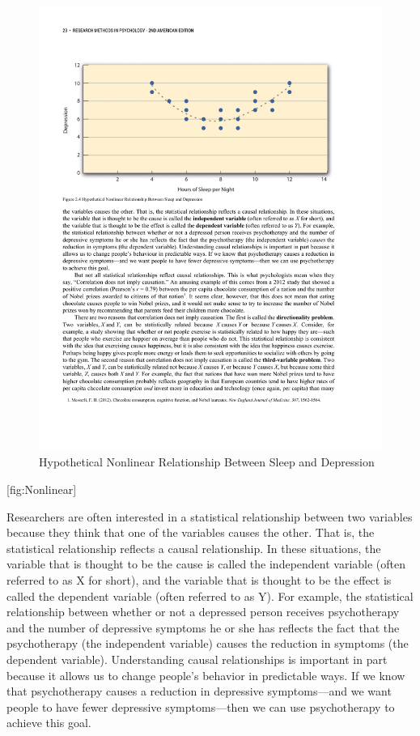 \documentclass[]{book}
\theoremstyle{definition}
\theoremstyle{definition}
\theoremstyle{remark}
\begin{document}
\begin{figure}[htbp]
\centering
\includegraphics{figures/C2F5Ucurve.pdf}
\caption{Hypothetical Nonlinear Relationship Between Sleep and
Depression}
\end{figure}

{[}fig:Nonlinear{]}

Researchers are often interested in a statistical relationship between
two variables because they think that one of the variables causes the
other. That is, the statistical relationship reflects a causal
relationship. In these situations, the variable that is thought to be
the cause is called the independent variable (often referred to as X for
short), and the variable that is thought to be the effect is called the
dependent variable (often referred to as Y). For example, the
statistical relationship between whether or not a depressed person
receives psychotherapy and the number of depressive symptoms he or she
has reflects the fact that the psychotherapy (the independent variable)
causes the reduction in symptoms (the dependent variable). Understanding
causal relationships is important in part because it allows us to change
people's behavior in predictable ways. If we know that psychotherapy
causes a reduction in depressive symptoms---and we want people to have
fewer depressive symptoms---then we can use psychotherapy to achieve
this goal.
\end{document}
